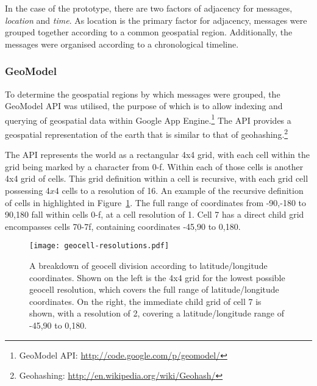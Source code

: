 \documentclass{article}
\begin{document}
In the case of the prototype, there are two factors of adjacency for messages, \emph{location} and \emph{time}. As location is the primary factor for adjacency, messages were grouped together according to a common geospatial region. Additionally, the messages were organised according to a chronological timeline.


\subsubsection{GeoModel} %

To determine the geospatial regions by which messages were grouped, the GeoModel API was utilised, the purpose of which is to allow indexing and querying of geospatial data within Google App Engine.\footnote{GeoModel API: \url{http://code.google.com/p/geomodel/}} The API provides a geospatial representation of the earth that is similar to that of geohashing.\footnote{Geohashing: \url{http://en.wikipedia.org/wiki/Geohash/}}

The API represents the world as a rectangular 4x4 grid, with each cell within the grid being marked by a character from 0-f. Within each of those cells is another 4x4 grid of cells. This grid definition within a cell is recursive, with each grid cell possessing 4$x$4 cells to a resolution of 16. An example of the recursive definition of cells in highlighted in Figure~\ref{fig:geocell_resolutions}. The full range of coordinates from -90,-180 to 90,180 fall within cells 0-f, at a cell resolution of 1. Cell 7 has a direct child grid encompasses cells 70-7f, containing coordinates -45,90 to 0,180.

\begin{figure}
\begin{center}
\texttt{[image: geocell-resolutions.pdf]}
\caption{A breakdown of geocell division according to latitude/longitude coordinates. Shown on the left is the 4x4 grid for the lowest possible geocell resolution, which covers the full range of latitude/longitude coordinates. On the right, the immediate child grid of cell 7 is shown, with a resolution of 2, covering a latitude/longitude range of -45,90 to 0,180.}
\label{fig:geocell_resolutions}
\end{center}
\end{figure}

\end{document}
